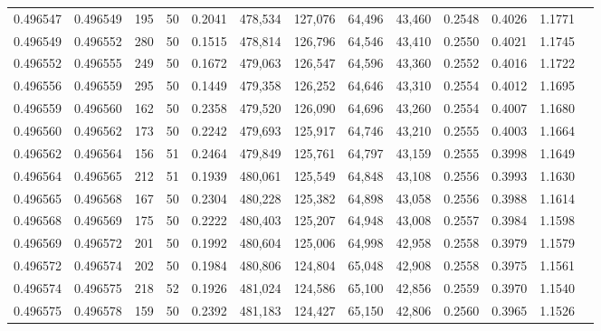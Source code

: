 \begin{tabular}{rrrrrrrrrrrrr}
0.496547 & 0.496549 &   195 &  50 &                                     0.2041 & 478,534 & 127,076 &  64,496 &  43,460 & 0.2548 & 0.4026 & 1.1771 \\
0.496549 & 0.496552 &   280 &  50 &                                     0.1515 & 478,814 & 126,796 &  64,546 &  43,410 & 0.2550 & 0.4021 & 1.1745 \\
0.496552 & 0.496555 &   249 &  50 &                                     0.1672 & 479,063 & 126,547 &  64,596 &  43,360 & 0.2552 & 0.4016 & 1.1722 \\
0.496556 & 0.496559 &   295 &  50 &                                     0.1449 & 479,358 & 126,252 &  64,646 &  43,310 & 0.2554 & 0.4012 & 1.1695 \\
0.496559 & 0.496560 &   162 &  50 &                                     0.2358 & 479,520 & 126,090 &  64,696 &  43,260 & 0.2554 & 0.4007 & 1.1680 \\
0.496560 & 0.496562 &   173 &  50 &                                     0.2242 & 479,693 & 125,917 &  64,746 &  43,210 & 0.2555 & 0.4003 & 1.1664 \\
0.496562 & 0.496564 &   156 &  51 &                                     0.2464 & 479,849 & 125,761 &  64,797 &  43,159 & 0.2555 & 0.3998 & 1.1649 \\
0.496564 & 0.496565 &   212 &  51 &                                     0.1939 & 480,061 & 125,549 &  64,848 &  43,108 & 0.2556 & 0.3993 & 1.1630 \\
0.496565 & 0.496568 &   167 &  50 &                                     0.2304 & 480,228 & 125,382 &  64,898 &  43,058 & 0.2556 & 0.3988 & 1.1614 \\
0.496568 & 0.496569 &   175 &  50 &                                     0.2222 & 480,403 & 125,207 &  64,948 &  43,008 & 0.2557 & 0.3984 & 1.1598 \\
0.496569 & 0.496572 &   201 &  50 &                                     0.1992 & 480,604 & 125,006 &  64,998 &  42,958 & 0.2558 & 0.3979 & 1.1579 \\
0.496572 & 0.496574 &   202 &  50 &                                     0.1984 & 480,806 & 124,804 &  65,048 &  42,908 & 0.2558 & 0.3975 & 1.1561 \\
0.496574 & 0.496575 &   218 &  52 &                                     0.1926 & 481,024 & 124,586 &  65,100 &  42,856 & 0.2559 & 0.3970 & 1.1540 \\
0.496575 & 0.496578 &   159 &  50 &                                     0.2392 & 481,183 & 124,427 &  65,150 &  42,806 & 0.2560 & 0.3965 & 1.1526 \\

\end{tabular}
